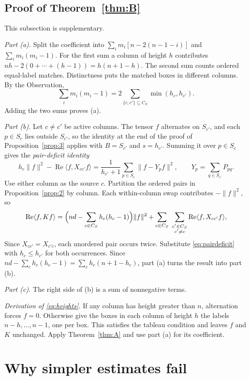 \documentclass[11pt]{amsart}
\newcommand{\notlean}{supplementary}
\theoremstyle{definition}
\theoremstyle{remark}
\begin{document}
\subsection{Proof of Theorem~\ref{thm:B}}\label{sec:proofB}

This subsection is \notlean.

\emph{Part (a).} Split the coefficient into
\(\sum_i m_i[n-2(n-1-i)]\) and \(\sum_i m_i(m_i-1)\).
For the first sum a column of height \(h\) contributes
\(nh-2(0+\cdots+(h-1))=h(n+1-h)\).
The second sum counts ordered equal-label matches. Distinctness puts the
matched boxes in different columns. By the Observation,
\[
\sum_i m_i(m_i-1)=2\sum_{\{c,c'\}\subseteq C_S}\min(h_c,h_{c'}).
\]
Adding the two sums proves (a).

\emph{Part (b).} Let \(c\ne c'\) be active columns. The tensor \(f\)
alternates on \(S_{c'}\), and each \(p\in S_c\) lies outside \(S_{c'}\), so
the identity at the end of the proof of Proposition~\ref{prop:3} applies with
\(B=S_{c'}\) and \(s=h_{c'}\). Summing it over \(p\in S_c\) gives the
\emph{pair-deficit identity}
\begin{equation}\label{eq:pairdeficit}
h_c\|f\|^2-\operatorname{Re}\langle f,X_{cc'}f\rangle
=\frac{1}{h_{c'}+1}\sum_{p\in S_c}\|f-Y_pf\|^2,\qquad
Y_p=\sum_{q\in S_{c'}}P_{pq}.
\end{equation}
Use either column as the source \(c\). Partition the ordered pairs in
Proposition~\ref{prop:2} by column. Each within-column swap contributes
\(-\|f\|^2\), so
\[
\operatorname{Re}\langle f,Kf\rangle
=\Bigl(nd-\sum_{c\in C_S}h_c(h_c-1)\Bigr)\|f\|^2
+\sum_{c\in C_S}\ \sum_{\substack{c'\in C_S\\c'\ne c}}
\operatorname{Re}\langle f,X_{cc'}f\rangle ,
\]
Since \(X_{cc'}=X_{c'c}\), each unordered pair occurs twice.
Substitute \eqref{eq:pairdeficit} with \(h_c\le h_{c'}\) for both occurrences. Since \(nd-\sum_c h_c(h_c-1)=\sum_c h_c(n+1-h_c)\), part (a) turns the
result into part (b).

\emph{Part (c).} The right side of (b) is a sum of nonnegative terms.

\emph{Derivation of \eqref{eq:heights}.} If any column has height greater
than \(n\), alternation forces \(f=0\). Otherwise give the boxes in each
column of height \(h\) the labels \(n-h,\ldots,n-1\), one per box. This
satisfies the tableau condition and leaves \(f\) and \(K\) unchanged.
Apply Theorem~\ref{thm:A} and use part (a) for its coefficient.

\section{Why simpler estimates fail}\label{sec:fail}
\end{document}
